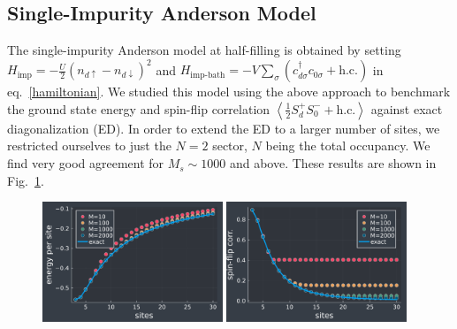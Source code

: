 \documentclass[reprint]{revtex4-2}
\begin{document}
\subsection{Single-Impurity Anderson Model}
The single-impurity Anderson model at half-filling is obtained by setting \(H_\text{imp}=-\frac{U}{2}\left(n_{d \uparrow} - n_{d \downarrow}\right)^2 \) and \(H_\text{imp-bath} = -V\sum_\sigma \left(c^\dagger_{d\sigma}c_{0\sigma} + \text{h.c.}\right)\) in eq.~\ref{hamiltonian}. We studied this model using the above approach to benchmark the ground state energy and spin-flip correlation \(\left<\frac{1}{2}S_d^+ S_0^- + \text{h.c.} \right>\) against exact diagonalization (ED). In order to extend the ED to a larger number of sites, we restricted ourselves to just the \(N=2\) sector, \(N\) being the total occupancy. We find very good agreement for \(M_s \sim 1000\) and above. These results are shown in Fig.~\ref{comparisonSIAM}.
\begin{figure}[!htpb]
\centering
\includegraphics[width=0.48\textwidth]{energy.pdf}
\includegraphics[width=0.48\textwidth]{spinflipcomparison.pdf}
\label{comparisonSIAM}
\end{figure}
\end{document}
